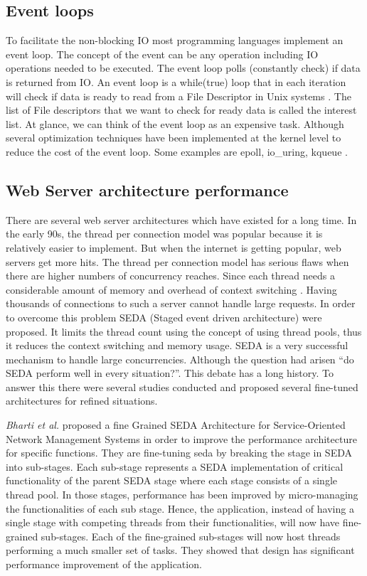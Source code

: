 \subsection{Event loops}
To facilitate the non-blocking IO most programming languages implement an event loop. The concept
of the event can be any operation including IO operations needed to be executed. The event loop polls
(constantly check) if data is returned from IO. An event loop is a while(true) loop that in
each iteration will check if data is ready to read from a File Descriptor in Unix systems \cite{device_file}. The
list of File descriptors that we want to check for ready data is called the interest list. At glance, we can
think of the event loop as an expensive task. Although several optimization techniques have been implemented at the kernel level to reduce the cost of the event loop. Some examples are epoll,
io{\_}uring, kqueue \cite{web_pipeline,io_uring}.


\subsection{Web Server architecture performance}

There are several web server architectures which have existed for a long time. In the early 90s, the thread per connection model was popular because it is relatively easier to implement. But when the internet is getting popular, web servers get more hits. The thread per connection model has serious flaws when there are higher numbers of concurrency reaches. Since each thread needs a considerable amount of memory and overhead of context switching \cite{seda}. Having thousands of connections to such a server cannot handle large requests. In order to overcome this problem SEDA (Staged event driven architecture) \cite{seda} were proposed. It limits the thread count using the concept of using thread pools, thus it reduces the context switching and memory usage. SEDA is a very successful mechanism to handle large concurrencies. Although the question had arisen “do SEDA perform well in every situation?”. \cite{Scalable_Threads_for_Internet_Services,events_are_bad,event_deriven_programming_for_robust_software} This debate has a long history. To answer this there were several studies conducted and proposed several fine-tuned architectures for refined situations.

\textit{Bharti et al.} \cite{fine_grained_SEDA} proposed a fine Grained SEDA Architecture for Service-Oriented Network Management Systems in order to improve the performance architecture for specific functions. They are fine-tuning \acrshort{seda} by breaking the stage in SEDA into sub-stages. Each sub-stage represents a SEDA implementation of critical functionality of the parent SEDA stage where each stage consists of a single thread pool. In those stages, performance has been improved by micro-managing the functionalities of each sub stage. Hence, the application, instead of having a single stage with competing threads from their functionalities, will now have fine-grained sub-stages. Each of the fine-grained sub-stages will now host threads performing a much smaller set of tasks. They showed that design has significant performance improvement of the application. 

